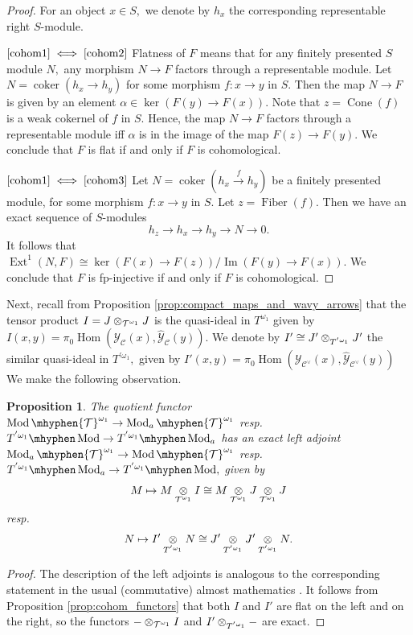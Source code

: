 \documentclass[11pt,leqno]{amsart}
\newcommand{\Iff}[2]{$\text{\ref{#1}}\iff\text{\ref{#2}}$}
\newtheorem{prop}[theo]{Proposition}
\numberwithin{equation}{section}
\def\Hom{\operatorname{Hom}}
\newcommand{\tens}[1]{%
  \mathbin{\mathop{\otimes}\displaylimits_{#1}}%
}
\newcommand{\hy}{\mhyphen}
\newcommand{\xto}{\xrightarrow}
\newcommand{\Cone}{\operatorname{Cone}}
\newcommand{\Fiber}{\operatorname{Fiber}}
\newcommand{\cC}{{\mathcal C}}
\newcommand{\cY}{{\mathcal Y}}
\newcommand{\cT}{{\mathcal T}}
\newcommand{\coker}{\operatorname{coker}}
\newcommand{\im}{\operatorname{Im}}
\newcommand{\Ext}{\operatorname{Ext}}
\newcommand{\Mod}{\operatorname{Mod}}
\begin{document}
\begin{proof}
	For an object $x\in S,$ we denote by $h_x$ the corresponding representable right $S$-module.
	
	\Iff{cohom1}{cohom2} Flatness of $F$ means that for any finitely presented $S$ module $N,$ any morphism $N\to F$ factors through a representable module. Let $N=\coker(h_x\to h_y)$ for some morphism $f:x\to y$ in $S.$ Then the map $N\to F$ is given by an element $\alpha\in\ker(F(y)\to F(x)).$ Note that $z=\Cone(f)$ is a weak cokernel of $f$ in $S.$ Hence, the map $N\to F$ factors through a representable module iff $\alpha$ is in the image of the map $F(z)\to F(y).$ We conclude that $F$ is flat if and only if $F$ is cohomological.
	
	\Iff{cohom1}{cohom3} Let $N=\coker(h_x\xto{f} h_y)$ be a finitely presented module, for some morphism $f:x\to y$ in $S.$ Let $z=\Fiber(f).$ Then we have an exact sequence of $S$-modules
	$$h_z\to h_x\to h_y\to N\to 0.$$ 
	It follows that $\Ext^1(N,F)\cong \ker(F(x)\to F(z))/\im(F(y)\to F(x)).$ We conclude that $F$ is fp-injective if and only if $F$ is cohomological.
\end{proof}

Next, recall from Proposition \ref{prop:compact_maps_and_wavy_arrows} that the tensor product $I=J\tens{\cT^{\omega_1}}J$ is the quasi-ideal in $T^{\omega_1}$ given by $I(x,y)=\pi_0\Hom(\cY_{\cC}(x),\hat{\cY}_{\cC}(y)).$ We denote by $I'\cong J'\tens{T^{'\omega_1}}J'$ the similar quasi-ideal in $T^{'\omega_1},$ given by $I'(x,y)=\pi_0\Hom(\cY_{\cC^{\vee}}(x),\hat{\cY}_{\cC^{\vee}}(y))$ We make the following observation.

\begin{prop}\label{prop:left_adjoint_almost_modules} The quotient functor $\Mod\hy\cT^{\omega_1}\to \Mod_a\hy\cT^{\omega_1}$ resp. $T^{'\omega_1}\hy\Mod\to T^{'\omega_1}\hy\Mod_a$ has an exact left adjoint $\Mod_a\hy\cT^{\omega_1}\to \Mod\hy\cT^{\omega_1}$ resp. $T^{'\omega_1}\hy\Mod_a\to T^{'\omega_1}\hy\Mod,$ given by $$M\mapsto M\tens{\cT^{\omega_1}}I\cong M\tens{\cT^{\omega_1}}J\tens{\cT^{\omega_1}}J$$ resp. $$N\mapsto I'\tens{T^{'\omega_1}}N\cong J'\tens{T^{'\omega_1}}J'\tens{T^{'\omega_1}}N.$$\end{prop}

\begin{proof}The description of the left adjoints is analogous to the corresponding statement in the usual (commutative) almost mathematics \cite{GR03}. It follows from Proposition \ref{prop:cohom_functors} that both $I$ and $I'$ are flat on the left and on the right, so the functors $-\tens{\cT^{\omega_1}}I$ and $I'\tens{T^{'\omega_1}}-$ are exact.
\end{proof}
\end{document}
